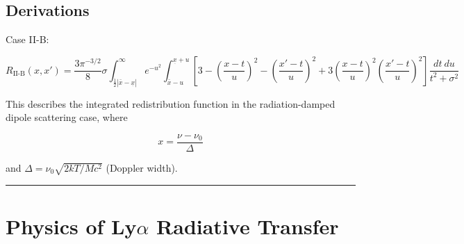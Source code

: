 \documentclass[onecolumn]{aastex63}
\begin{document}
\subsection{Derivations}

Case II-B:

\begin{equation}
    R_{\textrm{II-B}}(x, x') = \frac{3\pi^{-3/2}}{8}\sigma \int_{\frac{1}{2}|\bar{x} - \underset{\bar{}}{x}|}^{\infty} e^{-u^2}
    \int_{\bar{x}-u}^{\underset{\bar{}}{x}+u}\left[3 - \left(\frac{x-t}{u}\right)^2 - \left(\frac{x'-t}{u}\right)^2 + 3\left(\frac{x-t}{u}\right)^2\left(\frac{x'-t}{u}\right)^2\right]\frac{dt\ du}{t^2 + \sigma^2}
\end{equation}

This describes the integrated redistribution function in the radiation-damped dipole scattering case, where 

\begin{equation}
    x = \frac{\nu - \nu_0}{\Delta}
\end{equation}

and $\Delta = \nu_0 \sqrt{2kT/Mc^2}$ (Doppler width).




\vspace{1cm}
\hrule
\vspace{1cm}

\section{Physics of Ly$\alpha$ Radiative Transfer}
\begin{centering}

\cite{dijkstra2017}

\end{centering}
\end{document}
